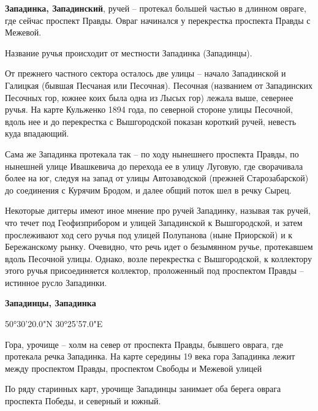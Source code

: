 \medskip

\textbf{Западинка, Западинский}, ручей – протекал большей частью в длинном овраге, где сейчас проспект Правды. Овраг начинался у перекрестка проспекта Правды с Межевой.
 
Название ручья происходит от местности Западинка (Западинцы). 

От прежнего частного сектора осталось две улицы – начало Западинской и Галицкая (бывшая Песчаная или Песочная). Песочная (названием от Западинских Песочных гор, южнее коих была одна из Лысых гор) лежала выше, севернее ручья. На карте Кульженко 1894 года, по северной стороне улицы Песочной, вдоль нее и до перекрестка с Вышгородской показан короткий ручей, невесть куда впадающий.

Сама же Западинка протекала так – по ходу нынешнего проспекта Правды, по нынешней улице Ивашкевича до перехода ее в улицу Луговую, где сворачивала более на юг, следуя на запад от улицы Автозаводской (прежней Старозабарской) до соединения с Курячим Бродом, и далее общий поток шел в речку Сырец.

Некоторые диггеры имеют иное мнение про ручей Западинку, называя так ручей, что течет под Геофизприбором и улицей Западинской к Вышгородской, и затем прослеживают ход сего ручья под улицей Полупанова (ныне Приорской) и к Бережанскому рынку. Очевидно, что речь идет о безымянном ручье, протекавшем вдоль Песочной улицы. Однако, возле перекрестка с Вышгородской, к коллектору этого ручья присоединяется коллектор, проложенный под проспектом Правды – истинное русло Западинки.\\

\medskip

\textbf{Западинцы, Западинка}

50°30'20.0"N 30°25'57.0"E

Гора, урочище – холм на север от проспекта Правды, бывшего оврага, где протекала речка Западинка. На карте середины 19 века гора Западинка лежит между проспектом Правды, проспектом Свободы и Межевой улицей


По ряду старинных карт, урочище Западинцы занимает оба берега оврага проспекта Победы, и северный и южный.

